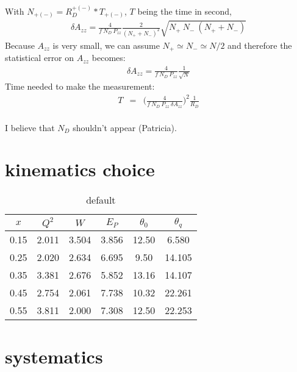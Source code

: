 \documentclass[11pt]{article}
\begin{document}
With $N_{+(-)} = R^{+(-)}_D * T_{+(-)}$, $T$ being the time in second, 
\begin{eqnarray}
\delta A_{zz} = \frac{4}{f~N_D~P_{zz}} \frac{2}{(N_++N_-)^2} \sqrt{N_+~N_-~(N_++N_-)}
\label{stat3} 
\end{eqnarray}
Because $A_{zz}$ is very small, we can assume $N_+ \simeq N_- \simeq N/2$ and therefore the statistical error on $A_{zz}$ becomes:
\begin{eqnarray}
\delta A_{zz} = \frac{4}{f~N_D~P_{zz}} \frac{1}{\sqrt{N}}
\label{stat4} 
\end{eqnarray}
Time needed to make the measurement:
\begin{eqnarray}
T &=& \Bigg(\frac{4}{f~N_D~P_{zz}~\delta A_{zz}}\Bigg)^2 \frac{1}{R_D} \\
\label{stat5} 
\end{eqnarray}

I believe that $N_D$ shouldn't appear (Patricia). 


\section{kinematics choice}

\begin{table}[htdp]
\caption{default}
\begin{center}
\begin{tabular}{|c|c|c|c|c|c|}
\hline
   $x$  &   $Q^2$ &    $W$  &  $E_P$  &  $\theta_0$  &  $\theta_q$ \\
\hline   
  0.15  &    2.011  &  3.504 &  3.856    &   12.50          &     6.580       \\
  0.25  &    2.020  &  2.634 &  6.695    &     9.50          &   14.105       \\
  0.35  &    3.381  &  2.676 &  5.852    &   13.16          &   14.107       \\
  0.45  &    2.754  &  2.061 &  7.738    &   10.32          &   22.261       \\
  0.55  &    3.811  &  2.000 &  7.308    &   12.50          &   22.253       \\
\hline  
\end{tabular}
\end{center}
\label{default}
\end{table}%

\section{systematics}
\end{document}
